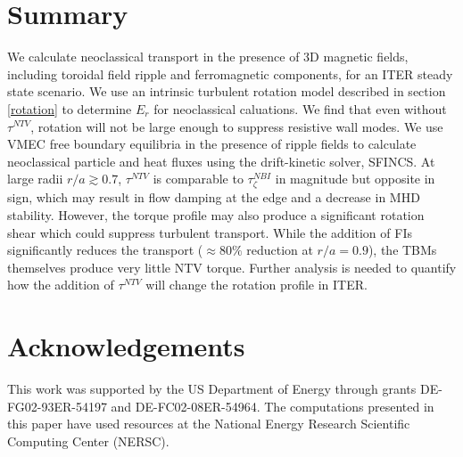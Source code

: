 \documentclass{article}
\begin{document}
\FloatBarrier

\section{Summary}\label{summary}

We calculate neoclassical transport in the presence of 3D magnetic fields, including toroidal field ripple and ferromagnetic components, for an ITER steady state scenario. We use an intrinsic turbulent rotation model described in section \ref{rotation} to determine $E_r$ for neoclassical caluations. We find that even without $\tau^{NTV}$, rotation will not be large enough to suppress resistive wall modes. We use VMEC free boundary equilibria in the presence of ripple fields to calculate neoclassical particle and heat fluxes using the drift-kinetic solver, SFINCS. At large radii $r/a \gtrsim 0.7$, $\tau^{NTV}$ is comparable to $\tau^{NBI}_{\zeta}$ in magnitude but opposite in sign, which may result in flow damping at the edge and a decrease in MHD stability. However, the torque profile may also produce a significant rotation shear which could suppress turbulent transport. While the addition of FIs significantly reduces the transport ($\approx 80\%$ reduction at $r/a = 0.9$), the TBMs themselves produce very little NTV torque. Further analysis is needed to quantify how the addition of $\tau^{NTV}$ will change the rotation profile in ITER. 

\section{Acknowledgements}

This work was supported by the US Department of Energy through grants DE-FG02-93ER-54197 and DE-FC02-08ER-54964. The computations presented in this paper have used resources at the National Energy Research Scientific Computing Center (NERSC). 


\small

\end{document}
